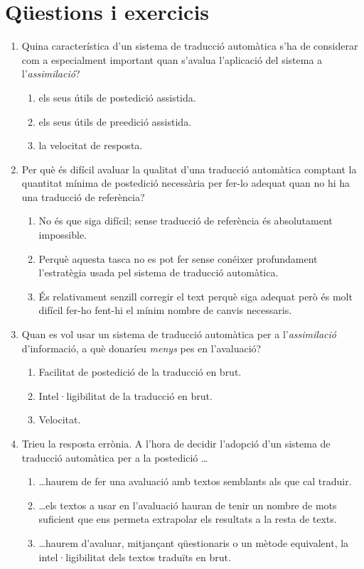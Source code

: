 \section{Qüestions i exercicis}

\begin{enumerate}
\item Quina característica d'un sistema de traducció automàtica s'ha
  de considerar com a especialment important quan s'avalua l'aplicació
  del sistema a l'\emph{assimilació}?  
  \begin{enumerate}
  \item els seus útils de postedició assistida.
  \item els seus útils de preedició assistida.
  \item la velocitat de resposta.
  \end{enumerate}

\item Per què és difícil avaluar la qualitat d'una traducció
  automàtica comptant la quantitat mínima de postedició necessària per
  fer-lo adequat quan no hi ha una traducció de referència?
  \begin{enumerate}
  \item No és que siga difícil; sense traducció de referència és
    absolutament impossible.
  \item Perquè aquesta tasca no es pot fer sense conéixer profundament
    l'estratègia usada pel sistema de traducció automàtica.
  \item És relativament senzill corregir el text perquè siga adequat
    però és molt difícil fer-ho fent-hi el mínim nombre de canvis
    necessaris.
  \end{enumerate}

\item Quan es vol usar un sistema de traducció automàtica per a
  l'\emph{assimilació} d'informació, a què donaríeu \emph{menys} pes
  en l'avaluació?
  \begin{enumerate}
  \item Facilitat de postedició de la traducció en brut.
  \item Intel·ligibilitat de la traducció en brut.
  \item Velocitat.
  \end{enumerate}

\item Trieu la resposta errònia. A l'hora de decidir l'adopció d'un
  sistema de traducció automàtica per a la postedició \ldots
  \begin{enumerate}
  \item \ldots haurem de fer una avaluació amb textos semblants als
    que cal traduir.
  \item \ldots els textos a usar en l'avaluació hauran de tenir un
    nombre de mots suficient que ens permeta extrapolar els resultats
    a la resta de texts.
  \item \ldots haurem d'avaluar, mitjançant qüestionaris o un mètode
    equivalent, la intel·ligibilitat dels textos traduïts en brut.
  \end{enumerate}


\end{enumerate}
